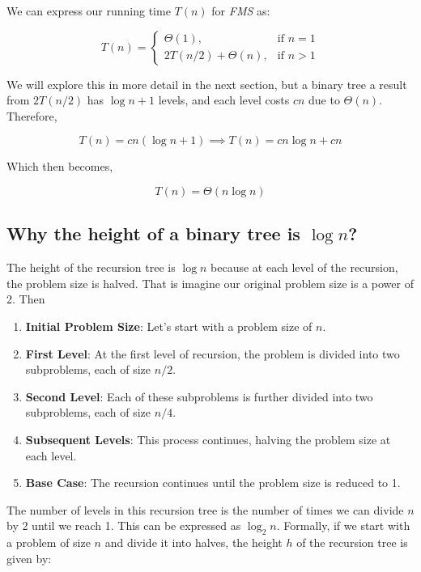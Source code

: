 \documentclass[a4paper,10pt]{article}
\begin{document}
We can express our running time $T(n)$ for \textit{FMS} as:

\begin{equation}
    T(n) =
    \begin{cases}
      \Theta(1), & \text{if } n = 1 \\
      2T(n/2) + \Theta(n), & \text{if } n > 1
    \end{cases}
\end{equation}

We will explore this in more detail in the next section, but a binary tree a result from $2T(n/2)$ has $\log n + 1$ levels, and each level costs $cn$ due to $\Theta(n)$. Therefore,

\begin{equation}
    T(n) = cn(\log n + 1) \implies T(n) = cn\log n + cn
\end{equation}

Which then becomes,

\begin{equation}
    T(n) = \Theta(n\log n)
\end{equation}

\subsection{Why the height of a binary tree is $\log n$?}

The height of the recursion tree is $\log n$ because at each level of the recursion, the problem size is halved. That is imagine our original problem size is a power of 2. Then

\begin{enumerate}
    \item \textbf{Initial Problem Size}: Let's start with a problem size of $n$.
    \item \textbf{First Level}: At the first level of recursion, the problem is divided into two subproblems, each of size $n/2$.
    \item \textbf{Second Level}: Each of these subproblems is further divided into two subproblems, each of size $n/4$.
    \item \textbf{Subsequent Levels}: This process continues, halving the problem size at each level.
    \item \textbf{Base Case}: The recursion continues until the problem size is reduced to 1.
\end{enumerate}

The number of levels in this recursion tree is the number of times we can divide $n$ by 2 until we reach 1. This can be expressed as $\log_2 n$. Formally, if we start with a problem of size $n$ and divide it into halves, the height $h$ of the recursion tree is given by:
\end{document}
